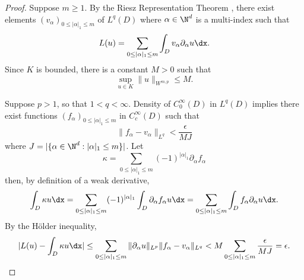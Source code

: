 \begin{proof}
Suppose \(m \geq 1\). By the Riesz Representation Theorem \cite[Theorem 3.9]{adams2003sobolev}, there exist elements \((v_\alpha)_{0\leq |\alpha|_1 \leq m}\) of 
\(L^q (D)\) where \(\alpha \in \N^d\) is a multi-index such that
\[L(u) = \sum_{0 \leq |\alpha|_1 \leq m} \int_D v_\alpha \partial_\alpha u  \dx.\]
Since \(K\) is bounded, there is a constant \(M > 0\) such that
\[\sup_{u \in K} \|u\|_{W^{m,p}} \leq M.\]

Suppose \(p > 1\), so that \(1 < q < \infty\). Density of \(C^\infty_0(D)\) in \(L^q (D)\) implies there exist
functions \((f_\alpha)_{0 \leq |\alpha|_1 \leq m}\) in \(C^\infty_c(D)\) such that 
\[\|f_\alpha - v_\alpha\|_{L^q} < \frac{\epsilon}{MJ}\]
where \(J = |\{\alpha \in \N^d : |\alpha|_1 \leq m \}|\). Let
\[\kappa = \sum_{0 \leq |\alpha|_1 \leq m} (-1)^{|\alpha|_1} \partial_\alpha f_\alpha\]
then, by definition of a weak derivative, 
\[\int_D \kappa u \dx = \sum_{0 \leq |\alpha|_1 \leq m} (-1)^{|\alpha|_1} \int_D \partial_\alpha f_\alpha  u \dx = \sum_{0 \leq |\alpha|_1 \leq m} \int_D f_\alpha \partial_\alpha u \dx.  \]
By the H{\"o}lder inequality,
\[|L(u) - \int_D \kappa u \dx | \leq \sum_{0 \leq |\alpha|_1 \leq m} \|\partial_\alpha u\|_{L^p} \|f_\alpha - v_\alpha\|_{L^q} < M \sum_{0 \leq |\alpha|_1 \leq m} \frac{\epsilon}{MJ} = \epsilon.\]


\end{proof}
